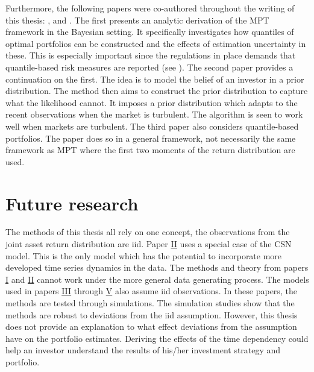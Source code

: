 \documentclass[12pt, twoside]{book}\usepackage{knitr}
\begin{document}
Furthermore, the following papers were co-authored throughout the writing of this thesis: \cite{bodnar2020quantile}, \cite{bodnar2021bayesian}  and \cite{bodnar2021quantile}.
The first presents an analytic derivation of the MPT framework in the Bayesian setting. 
It specifically investigates how quantiles of optimal portfolios can be constructed and the effects of estimation uncertainty in these. 
This is especially important since the regulations in place demands that quantile-based risk measures are reported (see \citet{basel4}).
The second paper provides a continuation on the first. 
The idea is to model the belief of an investor in a prior distribution. 
The method then aims to construct the prior distribution to capture what the likelihood cannot. 
It imposes a prior distribution which adapts to the recent observations when the market is turbulent. 
The algorithm is seen to work well when markets are turbulent.
The third paper also considers quantile-based portfolios. 
The paper does so in a general framework, not necessarily the same framework as MPT where the first two moments of the return distribution are used.



\chapter{Future research}\label{ch:future}


The methods of this thesis all rely on one concept, the observations from the joint asset return distribution are iid.
Paper \hyperref[sec:paper2]{II} uses a special case of the CSN model.
This is the only model which has the potential to incorporate more developed time series dynamics in the data.
The methods and theory from papers \hyperref[sec:paper1]{I} and \hyperref[sec:paper2]{II} cannot work under the more general data generating process.
The models used in papers \hyperref[sec:paper3]{III} through \hyperref[sec:paper5]{V} also assume iid observations.
In these papers, the methods are tested through simulations.
The simulation studies show that the methods are robust to deviations from the iid assumption.
However, this thesis does not provide an explanation to what effect deviations from the assumption have on the portfolio estimates.
Deriving the effects of the time dependency could help an investor understand the results of his/her investment strategy and portfolio.
\end{document}
